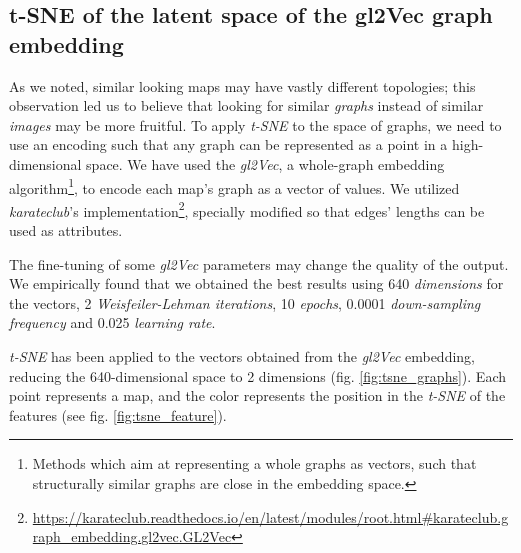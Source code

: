 \subsection{t-SNE of the latent space of the gl2Vec graph embedding}
\label{subsec:tsne_graphs}

As we noted, similar looking maps may have vastly different topologies; this observation led us to believe that looking for similar \textit{graphs} instead of similar \textit{images} may be more fruitful. To apply \textit{t-SNE} to the space of graphs, we need to use an encoding such that any graph can be represented as a point in a high-dimensional space. We have used the \textit{gl2Vec}, a whole-graph embedding algorithm\footnote{Methods which aim at representing a whole graphs as vectors, such that structurally similar graphs are close in the embedding space.}, to encode each map's graph as a vector of values. We utilized \textit{karateclub}'s implementation\footnote{\url{https://karateclub.readthedocs.io/en/latest/modules/root.html\#karateclub.graph_embedding.gl2vec.GL2Vec}}, specially modified so that edges' lengths can be used as attributes. 

The fine-tuning of some \textit{gl2Vec} parameters may change the quality of the output. We empirically found that we obtained the best results using 640 \textit{dimensions} for the vectors, 2 \textit{Weisfeiler-Lehman iterations}, 10 \textit{epochs}, 0.0001 \textit{down-sampling frequency} and 0.025 \textit{learning rate}.

\textit{t-SNE} has been applied to the vectors obtained from the \textit{gl2Vec} embedding, reducing the 640-dimensional space to 2 dimensions (fig. \cref{fig:tsne_graphs}). Each point represents a map, and the color represents the position in the \textit{t-SNE} of the features (see fig. \cref{fig:tsne_feature}).

